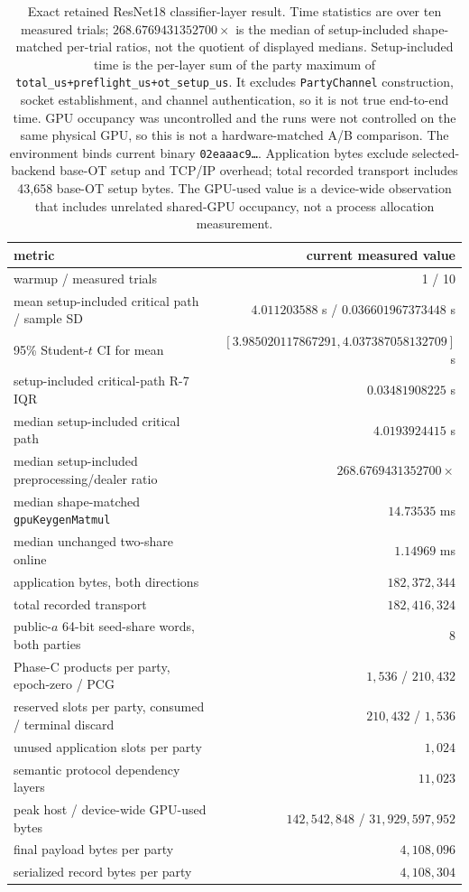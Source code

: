 \documentclass[11pt]{article}
\begin{document}
\begin{table}[ht]
\centering
\small
\begin{tabular}{@{}l r@{}}
\toprule
metric & current measured value\\
\midrule
warmup / measured trials & 1 / 10\\
mean setup-included critical path / sample SD & $4.011203588$ s / $0.036601967373448$ s\\
95\% Student-$t$ CI for mean & $[3.985020117867291,4.037387058132709]$ s\\
setup-included critical-path R-7 IQR & $0.03481908225$ s\\
median setup-included critical path & $4.0193924415$ s\\
median setup-included preprocessing/dealer ratio & $268.6769431352700\times$\\
median shape-matched \texttt{gpuKeygenMatmul} & $14.73535$ ms\\
median unchanged two-share online & $1.14969$ ms\\
application bytes, both directions & $182{,}372{,}344$\\
total recorded transport & $182{,}416{,}324$\\
public-$a$ 64-bit seed-share words, both parties & $8$\\
Phase-C products per party, epoch-zero / PCG & $1{,}536$ / $210{,}432$\\
reserved slots per party, consumed / terminal discard & $210{,}432$ / $1{,}536$\\
unused application slots per party & $1{,}024$\\
semantic protocol dependency layers & $11{,}023$\\
peak host / device-wide GPU-used bytes & $142{,}542{,}848$ / $31{,}929{,}597{,}952$\\
final payload bytes per party & $4{,}108{,}096$\\
serialized record bytes per party & $4{,}108{,}304$\\
\bottomrule
\end{tabular}
\caption{Exact retained ResNet18 classifier-layer result. Time statistics are over ten
measured trials; $268.6769431352700\times$ is the median of setup-included
shape-matched per-trial ratios, not the quotient of displayed medians.
Setup-included time is the per-layer sum of the party maximum of
\texttt{total\_us+preflight\_us+ot\_setup\_us}. It excludes
\texttt{PartyChannel} construction, socket establishment, and channel
authentication, so it is not true end-to-end time. GPU occupancy was
uncontrolled and the runs were not controlled on the same physical GPU, so
this is not a hardware-matched A/B comparison. The environment binds current
binary \texttt{02eaaac9\ldots}. Application bytes exclude selected-backend
base-OT
setup and TCP/IP overhead; total recorded transport includes 43{,}658 base-OT
setup bytes. The GPU-used value is a device-wide observation that includes
unrelated shared-GPU occupancy, not a process allocation measurement.}
\label{tab:modelscale}
\end{table}
\end{document}
